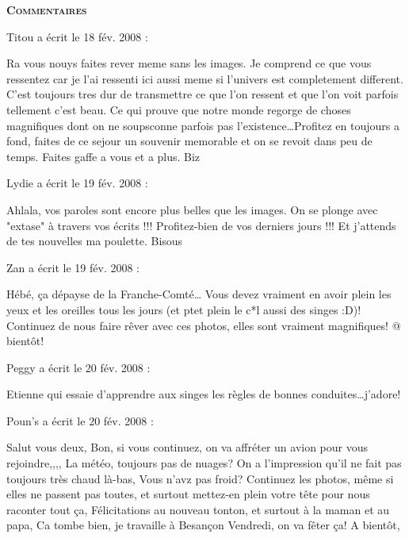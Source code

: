 \bigskip
\textbf{\textsc{Commentaires}}

\medskip
Titou a écrit le 18 fév. 2008 :
\begin{displayquote}
Ra vous nouys faites rever meme sans les images. Je comprend ce que vous ressentez car je l'ai ressenti ici aussi meme si l'univers est completement different. C'est toujours tres dur de transmettre ce que l'on ressent et que l'on voit parfois tellement c'est beau. Ce qui prouve que notre monde regorge de choses magnifiques dont on ne soupsconne parfois pas l'existence\dots Profitez en toujours a fond, faites de ce sejour un souvenir memorable et on se revoit dans peu de temps. Faites gaffe a vous et a plus. Biz
\end{displayquote}

\medskip
Lydie a écrit le 19 fév. 2008 :
\begin{displayquote}
Ahlala, vos paroles sont encore plus belles que les images. On se plonge avec "extase" à travers vos écrits !!!
Profitez-bien de vos derniers jours !!! Et j'attends de tes nouvelles ma poulette. Bisous
\end{displayquote}

\medskip
Zan a écrit le 19 fév. 2008 :
\begin{displayquote}
Hébé, ça dépayse de la Franche-Comté\dots
Vous devez vraiment en avoir plein les yeux et les oreilles tous les jours (et ptet plein le c*l aussi des singes :D)!
Continuez de nous faire rêver avec ces photos, elles sont vraiment magnifiques!
@ bientôt!
\end{displayquote}

\medskip
Peggy a écrit le 20 fév. 2008 :
\begin{displayquote}
Etienne qui essaie d'apprendre aux singes les règles de bonnes conduites\dots j'adore!
\end{displayquote}

\medskip
Poun's a écrit le 20 fév. 2008 :
\begin{displayquote}
Salut vous deux, Bon, si vous continuez, on va affréter un avion pour vous rejoindre,,,,
La météo, toujours pas de nuages? On a l'impression qu'il ne fait pas toujours très chaud là-bas, Vous n'avz pas froid?
Continuez les photos, même si elles ne passent pas toutes, et surtout mettez-en plein votre tête pour nous raconter tout ça,
Félicitations au nouveau tonton, et surtout à la maman et au papa,
Ca tombe bien, je travaille à Besançon Vendredi, on va fêter ça!
A bientôt,
\end{displayquote}

